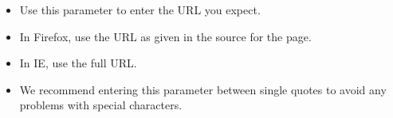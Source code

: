 
\begin{itemize}
\item Use this parameter to enter the URL you expect. 
\item In Firefox, use the URL as given in the source for the page. 
\item In IE, use the full URL. 
\item We recommend entering this parameter between single quotes  to avoid any problems with special characters. 
\end{itemize}
